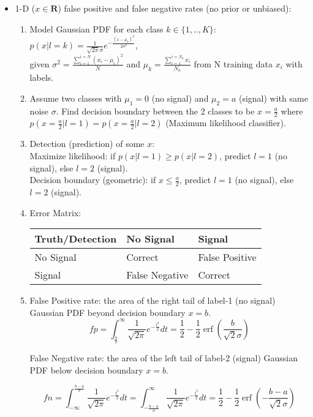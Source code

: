 \documentclass[11pt]{article}
\DeclareMathOperator{\erf}{erf}
\begin{document}
\begin{itemize}
    \item 1-D ($x \in \mathbf{R}$) false positive and false negative rates (no prior or unbiased):
\begin{enumerate}
    \item Model Gaussian PDF for each class $k \in \{1,..,K\}$:
    $p(x|l=k) = \frac{1}{\sqrt{2\pi}\sigma} e^{-\frac{{(x-\mu_k)}^2}{2\sigma^2}}$,\\
    given $\sigma^2=\frac{\sum_{i=1}^{i=N} {(x_i-\mu_i)}^2}{N}$ and $\mu_k = \frac{\sum_{i=1}^{i=N_k} x_i}{N_k}$ from N training data $x_i$ with labels. 
    \item Assume two classes with $\mu_1 = 0$ (no signal) and $\mu_2 = a$ (signal) with same noise $\sigma$. Find decision boundary between the 2 classes to be $x=\frac{a}{2}$ where $p(x=\frac{a}{2}|l=1) = p(x=\frac{a}{2}|l=2)$ (Maximum likelihood classifier).
    \item Detection (prediction) of some $x$: \\
    Maximize likelihood: if $p(x|l=1) \ge p(x|l=2)$, predict $l=1$ (no signal), else $l=2$ (signal).\\
    Decision boundary (geometric): if $x \leq \frac{a}{2}$, predict $l=1$ (no signal), else $l=2$ (signal).
    \item Error Matrix:
    
    \begin{tabular}{l|l|l}
    Truth/Detection&No Signal&Signal\\\hline
    No Signal&Correct&False Positive\\\hline
    Signal&False Negative&Correct\\
    \end{tabular}
    \item False Positive rate: the area of the right tail of label-1 (no signal) Gaussian PDF beyond decision boundary $x=b$.
    \begin{equation}
        fp = \int_{\frac{b}{\sigma}}^{\infty} \frac{1}{\sqrt{2\pi}} e^{-\frac{t^2}{2}}dt = \frac{1}{2} - \frac{1}{2} \erf(\frac{b}{\sqrt{2}\sigma})
    \label{eq:1}
    \end{equation}
    
    False Negative rate: the area of the left tail of label-2 (signal) Gaussian PDF below decision boundary $x=b$.
    
    \begin{equation}
        fn = \int_{-\infty}^{\frac{b-a}{\sigma}} \frac{1}{\sqrt{2\pi}} e^{-\frac{t^2}{2}}dt = \int_{-\frac{b-a}{\sigma}}^{\infty} \frac{1}{\sqrt{2\pi}} e^{-\frac{t^2}{2}}dt = \frac{1}{2} - \frac{1}{2} \erf(-\frac{b-a}{\sqrt{2}\sigma})
    \label{eq:2}
    \end{equation}
    

\end{enumerate}
\end{itemize}
\end{document}
